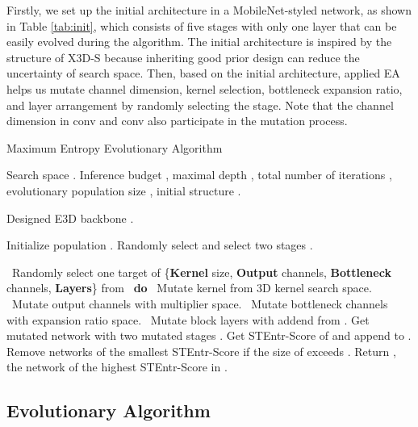 \documentclass{article} \usepackage{iclr2023_conference,times}
\begin{document}
Firstly, we set up the initial architecture in a MobileNet-styled network, as shown in Table \ref{tab:init}, which consists of five stages with only one layer that can be easily evolved during the algorithm. The initial architecture is inspired by the structure of X3D-S \citep{feichtenhofer2020x3d} because inheriting good prior design can reduce the uncertainty of search space.
Then, based on the initial architecture, applied EA helps us mutate channel dimension, kernel selection, bottleneck expansion ratio, and layer arrangement by randomly selecting the stage. Note that the channel dimension in conv and conv also participate in the mutation process.


\begin{algorithm}[ht]
 \caption{Maximum Entropy Evolutionary Algorithm}
 \label{ag:evolution}
 	\begin{algorithmic}[1]
		
		\REQUIRE Search space . Inference budget , maximal depth , total number of iterations , evolutionary population size , initial structure .
		
		\ENSURE Designed E3D backbone .
		
		\STATE Initialize population .
		\FOR{}
		\STATE Randomly select  and select two stages .
		
		\FOR{}
		\ {Randomly select one target of \{{\bf Kernel} size, {\bf Output} channels, {\bf Bottleneck} channels, {\bf Layers}\} from }\ {\bf do}
		\ {Mutate kernel from 3D kernel search space.}
		\ {Mutate output channels with multiplier space.}
		\ {Mutate bottleneck channels with expansion ratio space.}
		\ {Mutate block layers with addend from .}
		\ENDFOR
		\STATE Get mutated network  with two mutated stages .		
		\STATE Get STEntr-Score of  and append  to .
		\ENDIF
		\STATE Remove networks of the smallest STEntr-Score if the size of  exceeds .
		\ENDFOR
		\STATE Return , the network of the highest STEntr-Score in .
		
	\end{algorithmic}
	\label{al:ea}
\end{algorithm}



\subsection{Evolutionary Algorithm}
\end{document}
